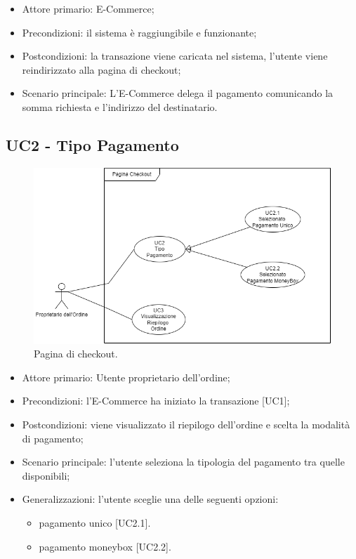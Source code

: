 \begin{itemize}
    \item Attore primario: E-Commerce;
    \item Precondizioni: il sistema è raggiungibile e funzionante;
    \item Postcondizioni: la transazione viene caricata nel sistema, l'utente viene reindirizzato alla pagina di checkout;
    \item Scenario principale: L'E-Commerce delega il pagamento comunicando la somma richiesta e l'indirizzo del destinatario.
\end{itemize}

\subsection{UC2 - Tipo Pagamento}\label{subsection: UC2}

    \begin{figure}[H]
    \centering
    \includegraphics[scale=0.7]{immagini/UseCases-UC2-1.png}
    \caption{Pagina di checkout.}
  \end{figure}

    \begin{itemize}
    \item Attore primario: Utente proprietario dell'ordine;
    \item Precondizioni: l'E-Commerce ha iniziato la transazione [UC1];
    \item Postcondizioni: viene visualizzato il riepilogo dell'ordine e scelta la modalità di pagamento;
    \item Scenario principale: l'utente seleziona la tipologia del pagamento tra quelle disponibili;
    \item Generalizzazioni: l'utente sceglie una delle seguenti opzioni:
    \begin{itemize}
        \item pagamento unico [UC2.1].
        \item pagamento moneybox [UC2.2].
    \end{itemize}
    \end{itemize}
    \clearpage

